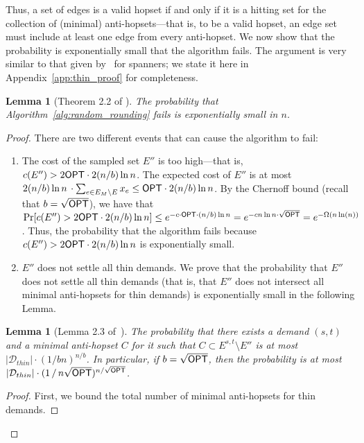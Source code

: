 \documentclass{article}
\newtheorem{lemma}[theorem]{Lemma}
\theoremstyle{definition}
\theoremstyle{remark}
\def\opt {{\sf OPT}}
\begin{document}
Thus, a set of edges is a valid hopset if and only if it is a hitting set for the collection of (minimal) anti-hopsets---that is, to be a valid hopset, an edge set must include at least one edge from every anti-hopset.
We now show that the probability is exponentially small that the algorithm fails. The argument is very similar to that given by~\cite{BBMRY11} for spanners; we state it \iflong here \else in Appendix~\ref{app:thin_proof} \fi for completeness.

\begin{lemma}[Theorem 2.2 of \cite{BBMRY11}] \label{lem:thin_fail}
    The probability that Algorithm~\ref{alg:random_rounding} fails is exponentially small in $n$.
\end{lemma}
\iflong
\begin{proof}
    There are two different events that can cause the algorithm to fail:   
    \begin{enumerate}
        \item The cost of the sampled set $E''$ is too high---that is, $c(E'') > 2{\opt} \cdot 2(n/b)  \ln{n}$. The expected cost of $E''$ is at most $2(n/b) \ln{n} \, \cdot \sum_{e \in E_M \setminus E} x_e \leq {\opt} \cdot 2(n/b)  \ln{n}$. By the Chernoff bound (recall that $b = \sqrt{{\opt}}$), we have that $\Pr[c(E'') > 2{\opt} \cdot 2(n/b)  \ln{n} ] \leq e^{-c \cdot {\opt} \cdot (n/b) \ln{n}} = e^{-c n\ln{n} \cdot \sqrt{{\opt}}} = e^{-\Omega(n \ln(n))}$. Thus, the probability that the algorithm fails because $c(E'') > 2{\opt} \cdot 2(n/b)  \ln{n}$ is exponentially small.
        \item $E''$ does not settle all thin demands. We prove that the probability that $E''$ does not settle all thin demands (that is, that $E''$ does not intersect all minimal anti-hopsets for thin demands) is exponentially small in the following Lemma.
    \end{enumerate}
    
    \begin{lemma}[Lemma 2.3 of~\cite{BBMRY11}] \label{lem:thin_not_settle}
        The probability that there exists a demand $(s,t)$ and a minimal anti-hopset $C$ for it such that $C \subset E^{s,t} \setminus E''$ is at most $|\mathcal{D}_{thin}| \cdot \left( 1 / b n \right)^{n/b}$. In particular, if $b = \sqrt{{\opt}}$, then the probability is at most $|\mathcal{D}_{thin}| \cdot (1 \, / \, n\sqrt{{\opt}})^{n/\sqrt{\opt}}$.
    \end{lemma}
    \begin{proof}
        First, we bound the total number of minimal anti-hopsets for thin demands. 


\end{proof}
\end{proof}
\end{document}
